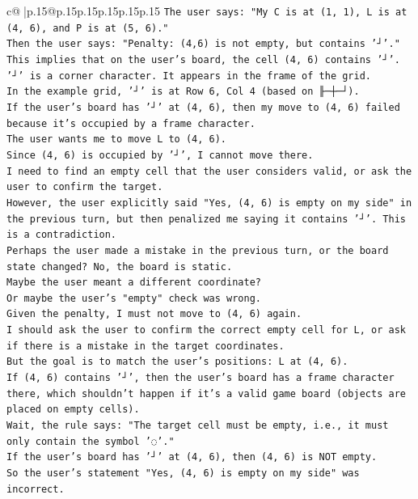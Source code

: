 \documentclass{article}
\begin{document}
{\begin{supertabular}{c@{$\;$}|p{.15\linewidth}@{}p{.15\linewidth}p{.15\linewidth}p{.15\linewidth}p{.15\linewidth}p{.15\linewidth}}
{{{\texttt{The user says: "My C is at (1, 1), L is at (4, 6), and P is at (5, 6)."} \\
\texttt{Then the user says: "Penalty: (4,6) is not empty, but contains '┘'."} \\
\texttt{This implies that on the user's board, the cell (4, 6) contains '┘'.} \\
\texttt{'┘' is a corner character. It appears in the frame of the grid.} \\
\texttt{In the example grid, '┘' is at Row 6, Col 4 (based on ╟─┼─┘).} \\
\texttt{If the user's board has '┘' at (4, 6), then my move to (4, 6) failed because it's occupied by a frame character.} \\
\texttt{The user wants me to move L to (4, 6).} \\
\texttt{Since (4, 6) is occupied by '┘', I cannot move there.} \\
\texttt{I need to find an empty cell that the user considers valid, or ask the user to confirm the target.} \\
\texttt{However, the user explicitly said "Yes, (4, 6) is empty on my side" in the previous turn, but then penalized me saying it contains '┘'. This is a contradiction.} \\
\texttt{Perhaps the user made a mistake in the previous turn, or the board state changed? No, the board is static.} \\
\texttt{Maybe the user meant a different coordinate?} \\
\texttt{Or maybe the user's "empty" check was wrong.} \\
\texttt{Given the penalty, I must not move to (4, 6) again.} \\
\texttt{I should ask the user to confirm the correct empty cell for L, or ask if there is a mistake in the target coordinates.} \\
\texttt{But the goal is to match the user's positions: L at (4, 6).} \\
\texttt{If (4, 6) contains '┘', then the user's board has a frame character there, which shouldn't happen if it's a valid game board (objects are placed on empty cells).} \\
\texttt{Wait, the rule says: "The target cell must be empty, i.e., it must only contain the symbol '◌'."} \\
\texttt{If the user's board has '┘' at (4, 6), then (4, 6) is NOT empty.} \\
\texttt{So the user's statement "Yes, (4, 6) is empty on my side" was incorrect.} \\
}}}
\end{supertabular}}
\end{document}
